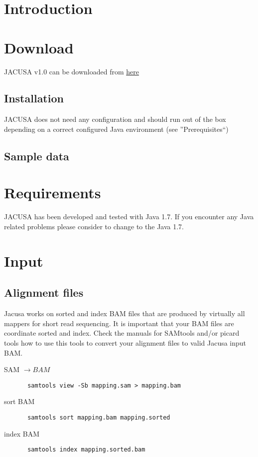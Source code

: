 \documentclass[10pt, a4paper]{article}
\begin{document}
\section{Introduction}

\section{Download}
JACUSA v1.0 can be downloaded from \href{http://}{here}
\subsection{Installation}
JACUSA does not need any configuration and should run out of the box depending on a correct configured Java environment (see ''Prerequisites``) 

\subsection{Sample data}

\section{Requirements}
JACUSA has been developed and tested with Java 1.7. 
If you encounter any Java related problems please consider to change to the Java 1.7.

\section{Input}
\subsection{Alignment files}
Jacusa works on sorted and index BAM files that are produced by virtually all mappers for short read sequencing.
It is important that your BAM files are coordinate sorted and index. 
Check the manuals for SAMtools and/or picard tools how to use this tools to convert your alignment files to valid Jacusa input BAM.  

\begin{description}
\item[SAM $\rightarrow BAM$] \begin{verbatim} samtools view -Sb mapping.sam > mapping.bam \end{verbatim}
\item[sort BAM] \begin{verbatim} samtools sort mapping.bam mapping.sorted \end{verbatim} 
\item[index BAM] \begin{verbatim} samtools index mapping.sorted.bam \end{verbatim}
\end{description}
\end{document}
